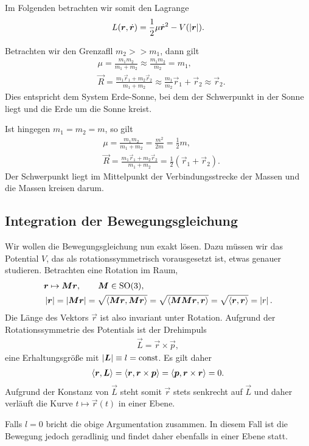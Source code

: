 Im Folgenden betrachten wir somit den Lagrange 
\begin{align*}
L(\bm{r},\dot{\bm{r}}) = \frac{1}{2}\mu\dot{\bm{r}}^2 - V(\left|\bm{r}\right|).
\end{align*}
\begin{bemn}[Bemerkungen.]
Betrachten wir den Grenzafll $m_2>>m_1$, dann gilt
\begin{align*}
&\mu = \frac{m_1m_2}{m_1+m_2}\approx \frac{m_1m_2}{m_2} = m_1,\\
&\vec{R} = \frac{m_1\vec{r}_1+m_2\vec{r}_2}{m_1+m_2} \approx 
\frac{m_1}{m_2}\vec{r}_1 + \vec{r}_2\approx \vec{r}_2.
\end{align*}
Dies entspricht dem System Erde-Sonne, bei dem der Schwerpunkt in der Sonne
liegt und die Erde um die Sonne kreist.

Ist hingegen $m_1=m_2=m$, so gilt
\begin{align*}
&\mu = \frac{m_1m_2}{m_1+m_2} = \frac{m^2}{2m} = \frac{1}{2}m,\\
&\vec{R} = \frac{m_1\vec{r}_1+m_2\vec{r}_2}{m_1+m_2} =
\frac{1}{2}\left(\vec{r}_1+\vec{r}_2\right).
\end{align*}
Der Schwerpunkt liegt im Mittelpunkt der Verbindungsstrecke der Massen und die
Massen kreisen darum.\maphere
\end{bemn}

\subsection{Integration der Bewegungsgleichung}
Wir wollen die Bewegungsgleichung nun exakt lösen. Dazu müssen wir das 
Potential $V$, das als rotationssymmetrisch vorausgesetzt ist, etwas genauer
studieren. Betrachten eine Rotation im Raum,
\begin{align*}
&\bm{r}\mapsto \bm{M}\bm{r},\qquad \bm{M}\in\mathrm{SO}(3),\\
&\left|\bm{r}\right| = \left|\bm{M}\bm{r}\right| =
\sqrt{\left\langle\bm{M}\bm{r},\bm{M}\bm{r}\right\rangle} =
\sqrt{\left\langle\bm{M}\bm{M}\bm{r},\bm{r}\right\rangle}
= \sqrt{\left\langle\bm{r},\bm{r}\right\rangle} = \left|r\right|.
\end{align*}
Die Länge des Vektors $\vec{r}$ ist also invariant unter Rotation. Aufgrund der
Rotationssymmetrie des Potentials ist der Drehimpuls
\begin{align*}
\vec{L} = \vec{r}\times\vec{p},
\end{align*}
eine Erhaltungsgröße mit $\left|\bm{L}\right|\equiv l = \mathrm{const}$. Es gilt daher
\begin{align*}
\left\langle\bm{r},\bm{L}\right\rangle = \left\langle\bm{r},\bm{r}\times\bm{p}\right\rangle =
\left\langle\bm{p},\bm{r}\times\bm{r}\right\rangle = 0.
\end{align*}
Aufgrund der Konstanz von $\vec{L}$ steht somit $\vec{r}$ stets senkrecht auf
$\vec{L}$ und daher verläuft die Kurve $t\mapsto \vec{r}(t)$ in einer Ebene.
\begin{bemn}
Falls $l=0$ bricht die obige Argumentation zusammen. In diesem Fall ist die
Bewegung jedoch geradlinig und findet daher ebenfalls in einer Ebene
statt.\maphere
\end{bemn}

